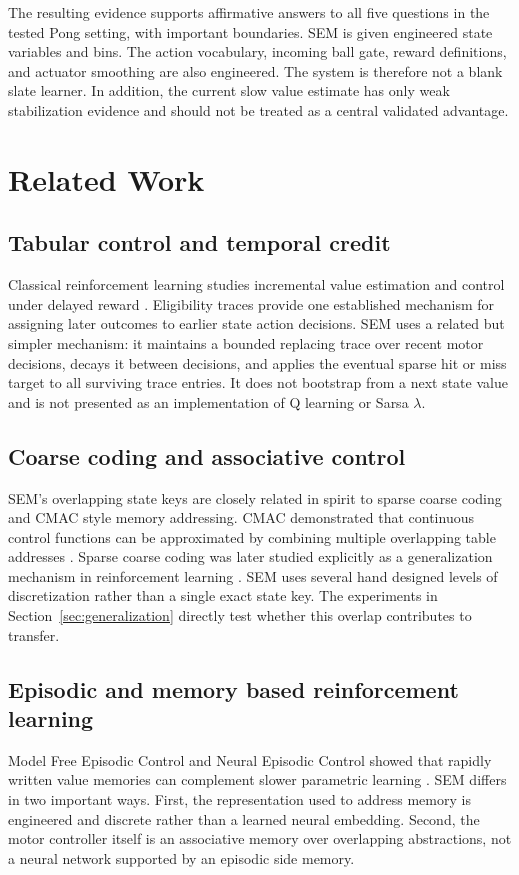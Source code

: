 \documentclass[10pt,twocolumn]{article}
\begin{document}
The resulting evidence supports affirmative answers to all five questions in the tested Pong setting, with important boundaries. SEM is given engineered state variables and bins. The action vocabulary, incoming ball gate, reward definitions, and actuator smoothing are also engineered. The system is therefore not a blank slate learner. In addition, the current slow value estimate has only weak stabilization evidence and should not be treated as a central validated advantage.

\section{Related Work}
\subsection{Tabular control and temporal credit}
Classical reinforcement learning studies incremental value estimation and control under delayed reward \citep{sutton1988td,watkins1992q,sutton2018rl}. Eligibility traces provide one established mechanism for assigning later outcomes to earlier state action decisions. SEM uses a related but simpler mechanism: it maintains a bounded replacing trace over recent motor decisions, decays it between decisions, and applies the eventual sparse hit or miss target to all surviving trace entries. It does not bootstrap from a next state value and is not presented as an implementation of Q learning or Sarsa $\lambda$.

\subsection{Coarse coding and associative control}
SEM's overlapping state keys are closely related in spirit to sparse coarse coding and CMAC style memory addressing. CMAC demonstrated that continuous control functions can be approximated by combining multiple overlapping table addresses \citep{albus1975cmac}. Sparse coarse coding was later studied explicitly as a generalization mechanism in reinforcement learning \citep{sutton1996coarse}. SEM uses several hand designed levels of discretization rather than a single exact state key. The experiments in Section~\ref{sec:generalization} directly test whether this overlap contributes to transfer.

\subsection{Episodic and memory based reinforcement learning}
Model Free Episodic Control and Neural Episodic Control showed that rapidly written value memories can complement slower parametric learning \citep{blundell2016mfec,pritzel2017nec}. SEM differs in two important ways. First, the representation used to address memory is engineered and discrete rather than a learned neural embedding. Second, the motor controller itself is an associative memory over overlapping abstractions, not a neural network supported by an episodic side memory.
\end{document}
